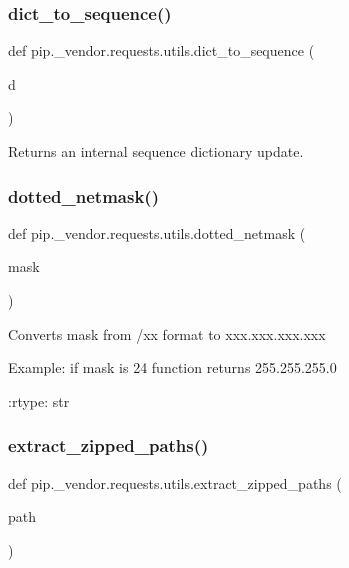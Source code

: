 \subsubsection{\texorpdfstring{dict\+\_\+to\+\_\+sequence()}{dict\_to\_sequence()}}
{\footnotesize\ttfamily def pip.\+\_\+vendor.\+requests.\+utils.\+dict\+\_\+to\+\_\+sequence (\begin{DoxyParamCaption}\item[{}]{d }\end{DoxyParamCaption})}

\begin{DoxyVerb}Returns an internal sequence dictionary update.\end{DoxyVerb}
 \mbox{\label{namespacepip_1_1__vendor_1_1requests_1_1utils_aff7793b7408df70069a1ff48cc665816}} 
\subsubsection{\texorpdfstring{dotted\+\_\+netmask()}{dotted\_netmask()}}
{\footnotesize\ttfamily def pip.\+\_\+vendor.\+requests.\+utils.\+dotted\+\_\+netmask (\begin{DoxyParamCaption}\item[{}]{mask }\end{DoxyParamCaption})}

\begin{DoxyVerb}Converts mask from /xx format to xxx.xxx.xxx.xxx

Example: if mask is 24 function returns 255.255.255.0

:rtype: str
\end{DoxyVerb}
 \mbox{\label{namespacepip_1_1__vendor_1_1requests_1_1utils_a3bc38a35bf1c124528a4abc53e34ca76}} 
\subsubsection{\texorpdfstring{extract\+\_\+zipped\+\_\+paths()}{extract\_zipped\_paths()}}
{\footnotesize\ttfamily def pip.\+\_\+vendor.\+requests.\+utils.\+extract\+\_\+zipped\+\_\+paths (\begin{DoxyParamCaption}\item[{}]{path }\end{DoxyParamCaption})}

